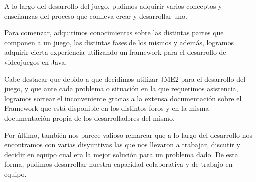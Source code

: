 \documentclass[a4paper,10pt]{article}
\begin{document}
A lo largo del desarrollo del juego, pudimos adquirir varios conceptos y
ense\~nanzas del proceso que conlleva crear y desarrollar uno.

Para comenzar, adquirimos conocimientos sobre las distintas partes que componen
a un juego, las distintas fases de los mismos y adem\'as, logramos adquirir
cierta experiencia utilizando un framework para el desarrollo de videojuegos en
Java.

Cabe destacar que debido a que decidimos utilizar JME2 para el
desarrollo
del juego, y que ante cada problema o situaci\'on en la que
requerimos asistencia,
logramos
sortear el inconveniente gracias a la extensa documentaci\'on sobre el Framework
que est\'a disponible en los distintos foros y en la misma documentaci\'on
propia
de los desarrolladores del mismo.

Por \'ultimo, tambi\'en nos parece valioso remarcar que a lo largo del
desarrollo nos encontramos con varias disyuntivas las que nos llevaron a
trabajar, discutir y decidir en equipo cual era la mejor soluci\'on para un
problema dado.  De esta forma, pudimos desarrollar nuestra capacidad
colaborativa y de trabajo en equipo.
\end{document}
